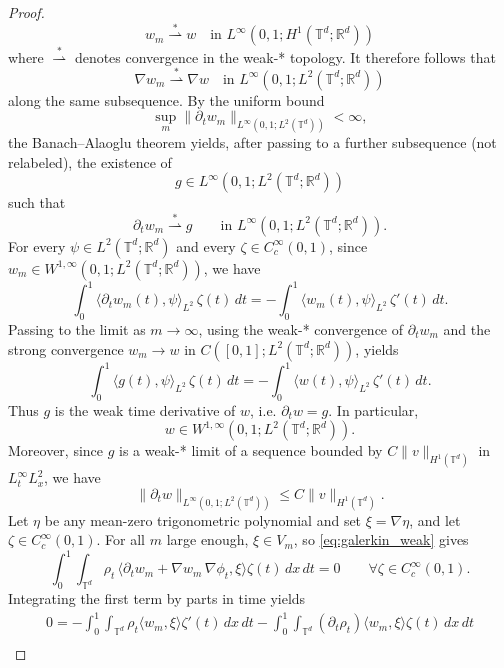 \documentclass[11pt]{article}
\begin{document}
\begin{proof}
    \[
    w_{m} \overset{*}{\rightharpoonup} w
    \quad\text{in }L^\infty(0,1;H^1(\mathbb T^d;\mathbb R^d))
    \]
    where $\overset{*}{\rightharpoonup}$ denotes convergence in the weak-* topology. It therefore follows that 
    \[
    \nabla w_{m} \overset{*}{\rightharpoonup} \nabla w
    \quad\text{in }L^\infty(0,1;L^2(\mathbb T^d;\mathbb R^d))
    \]
    along the same subsequence. By the uniform bound
    \[
    \sup_m \|\partial_t w_m\|_{L^\infty(0,1;L^2(\mathbb T^d))}
    < \infty,
    \]
    the Banach--Alaoglu theorem \citep[Theorem 3.15]{rudin1991functional} yields, after passing to a further subsequence
    (not relabeled), the existence of
    \[
    g \in L^\infty(0,1;L^2(\mathbb T^d;\mathbb R^d))
    \]
    such that
    \[
    \partial_t w_m \overset{*}{\rightharpoonup} g
    \qquad\text{in }L^\infty(0,1;L^2(\mathbb T^d;\mathbb R^d)).
    \]
    For every $\psi \in L^2(\mathbb T^d;\mathbb R^d)$ and every
    $\zeta \in C_c^\infty(0,1)$, since
    $w_m \in W^{1,\infty}(0,1;L^2(\mathbb T^d;\mathbb R^d))$, we have
    \[
    \int_0^1 \langle \partial_t w_m(t),\psi\rangle_{L^2}\,\zeta(t)\,dt
    =
    -\int_0^1 \langle w_m(t),\psi\rangle_{L^2}\,\zeta'(t)\,dt.
    \]
    Passing to the limit as $m\to\infty$, using the weak-* convergence of
    $\partial_t w_m$ and the strong convergence
    $w_m \to w$ in $C([0,1];L^2(\mathbb T^d;\mathbb R^d))$, yields
    \[
    \int_0^1 \langle g(t),\psi\rangle_{L^2}\,\zeta(t)\,dt
    =
    -\int_0^1 \langle w(t),\psi\rangle_{L^2}\,\zeta'(t)\,dt.
    \]
    Thus $g$ is the weak time derivative of $w$, i.e. $\partial_t w = g$. In particular,
    \[
    w \in W^{1,\infty}(0,1;L^2(\mathbb T^d;\mathbb R^d)).
    \]
    Moreover, since $g$ is a weak-* limit of a sequence bounded by
    $C\|v\|_{H^1(\mathbb T^d)}$ in $L^\infty_tL^2_x$, we have
    \[
    \|\partial_t w\|_{L^\infty(0,1;L^2(\mathbb T^d))}
    \le C\|v\|_{H^1(\mathbb T^d)}.
    \]
    Let $\eta$ be any mean-zero trigonometric polynomial and set $\xi=\nabla\eta$, and let $\zeta \in C^\infty_c(0,1)$. For all $m$
    large enough, $\xi\in V_m$, so \cref{eq:galerkin_weak} gives
    \[
    \int_0^1\!\!\int_{\mathbb T^d}
    \rho_t \,\big\langle \partial_t w_m+\nabla w_m\,\nabla\phi_t,\xi\big\rangle
    \zeta(t)\,dx\,dt=0
    \qquad
    \forall \zeta\in C_c^\infty(0,1).
    \]
    Integrating the first term by parts in time yields
    \begin{multline*}
    0 =
    -\int_0^1\int_{\mathbb T^d}
    \rho_t\langle w_m,\xi\rangle \zeta'(t)\,dx\,dt
    -\int_0^1\int_{\mathbb T^d}
    (\partial_t\rho_t)\langle w_m,\xi\rangle \zeta(t)\,dx\,dt \\

\end{multline*}
\end{proof}
\end{document}
